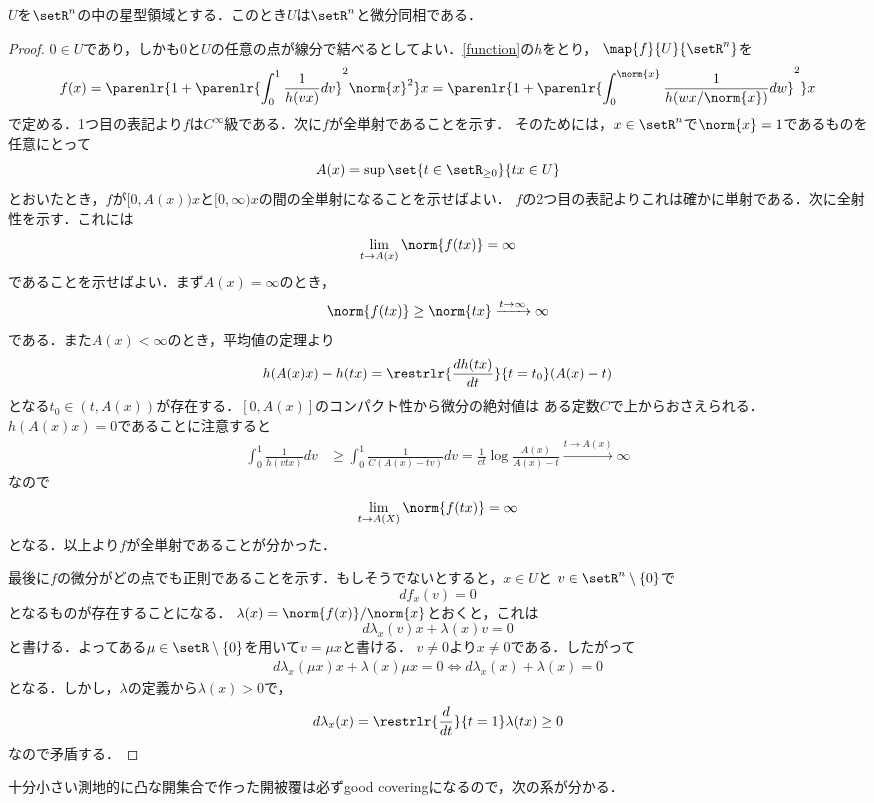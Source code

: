 \documentclass[uplatex]{jsarticle}
\begin{document}
\begin{proposition}
  $U$を$\setR^n$の中の星型領域とする．このとき$U$は$\setR^n$と微分同相である．
\end{proposition}

\begin{proof}
  $0\in U$であり，しかも0と$U$の任意の点が線分で結べるとしてよい．\cref{function}の$h$をとり，
  $\map{f}{U}{\setR^n}$を
    \[f(x)=\parenlr{1+\parenlr{\int_0^1 \frac{1}{h(vx)}dv}^2\norm{x}^2}x
    =\parenlr{1+\parenlr{\int_0^{\norm{x}}\frac{1}{h(wx/\norm{x})}dw }^2 }x \]
  で定める．1つ目の表記より$f$は$C^\infty$級である．次に$f$が全単射であることを示す．
  そのためには，$x\in \setR^n$で$\norm{x}=1$であるものを任意にとって
    \[A(x)=\sup\set{t\in \setR_{\geq0}}{tx\in U}\]
  とおいたとき，$f$が$[0, A(x))x$と$[0,\infty)x$の間の全単射になることを示せばよい．
  $f$の2つ目の表記よりこれは確かに単射である．次に全射性を示す．これには
    \[\lim_{t\to A(x)} \norm{f(tx)} = \infty \]
  であることを示せばよい．まず$A(x)=\infty$のとき，
    \[\norm{f(tx)} \geq \norm{tx} \xrightarrow{t\to \infty} \infty \]
  である．また$A(x)< \infty$のとき，平均値の定理より
    \[h(A(x)x)-h(tx)=\restrlr{\frac{dh(tx)}{dt}}{t=t_0} (A(x)-t) \]
  となる$t_0\in (t, A(x))$が存在する．$[0,A(x)]$のコンパクト性から微分の絶対値は
  ある定数$C$で上からおさえられる．$h(A(x)x)=0$であることに注意すると
  \begin{align*}
    \int_0^1 \frac{1}{h(vtx)}dv&\geq \int_0^1 \frac{1}{C(A(x)-tv)}dv
    =\frac{1}{ct}\log\frac{A(x)}{A(x)-t}\xrightarrow{t\to A(x)} \infty
  \end{align*}
  なので
    \[\lim_{t\to A(X)} \norm{f(tx)}=\infty \]
  となる．以上より$f$が全単射であることが分かった．

  最後に$f$の微分がどの点でも正則であることを示す．もしそうでないとすると，$x\in U$と
  $v\in \setR^n\setminus\{0\}$で
    \[df_x(v) = 0\]
  となるものが存在することになる．
  $\lambda(x) = \norm{f(x)}/\norm{x}$とおくと，これは
    \[d\lambda_x(v)x+\lambda(x)v = 0 \]
  と書ける．よってある$\mu \in \setR\setminus\{0\}$を用いて$v = \mu x$と書ける．
  $v\neq 0$より$x\neq 0$である．したがって
  \begin{align*}
    d\lambda_x(\mu x)x+\lambda(x)\mu x=0 \iff d\lambda_x(x)+\lambda(x)=0
  \end{align*}
  となる．しかし，$\lambda$の定義から$\lambda(x)>0$で，
    \[d\lambda_x(x)=\restrlr{\frac{d}{dt}}{t=1}\lambda(tx)\geq 0\]
  なので矛盾する．
\end{proof}

十分小さい測地的に凸な開集合で作った開被覆は必ずgood coveringになるので，次の系が分かる．
\end{document}
